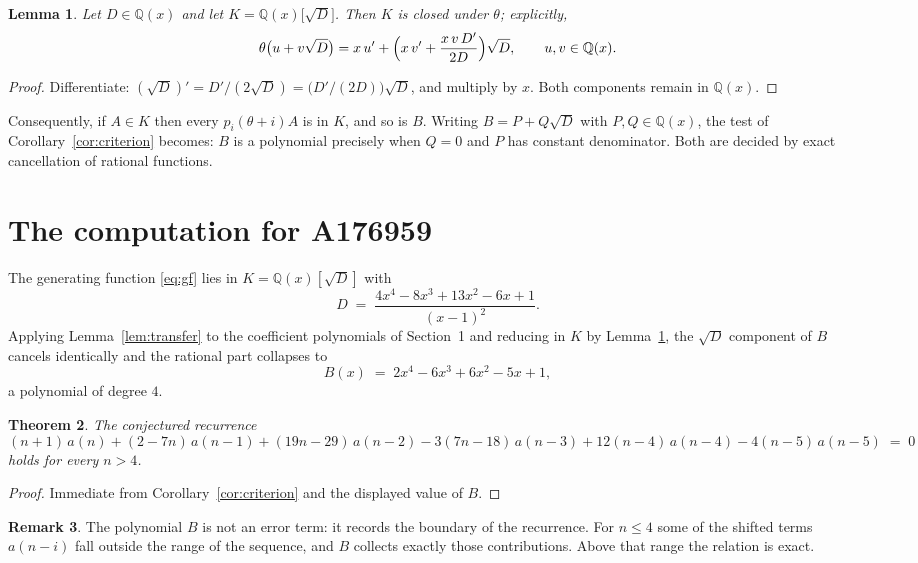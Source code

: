 \documentclass[11pt,a4paper]{article}
\theoremstyle{plain}
\newtheorem{theorem}{Theorem}
\newtheorem{lemma}[theorem]{Lemma}
\theoremstyle{definition}
\newtheorem{remark}[theorem]{Remark}
\begin{document}
\begin{lemma}\label{lem:field}
Let $D\in\mathbb{Q}(x)$ and let $K=\mathbb{Q}(x)\bigl[\sqrt{D}\bigr]$. Then $K$ is closed
under $\theta$; explicitly,
\[
\theta\bigl(u+v\sqrt{D}\bigr)=x\,u'+\Bigl(x\,v'+\frac{x\,v\,D'}{2D}\Bigr)\sqrt{D},
\qquad u,v\in\mathbb{Q}(x).
\]
\end{lemma}

\begin{proof}
Differentiate: $(\sqrt{D})'=D'/(2\sqrt{D})=\bigl(D'/(2D)\bigr)\sqrt{D}$, and multiply by
$x$. Both components remain in $\mathbb{Q}(x)$.
\end{proof}

Consequently, if $A\in K$ then every $p_{i}(\theta+i)A$ is in $K$, and so is $B$. Writing
$B=P+Q\sqrt{D}$ with $P,Q\in\mathbb{Q}(x)$, the test of Corollary~\ref{cor:criterion}
becomes: $B$ is a polynomial precisely when $Q=0$ and $P$ has constant denominator. Both
are decided by exact cancellation of rational functions.

\section{The computation for A176959}

The generating function \eqref{eq:gf} lies in $K=\mathbb{Q}(x)[\sqrt{D}]$ with
\[
D \;=\; \frac{4 x^{4} - 8 x^{3} + 13 x^{2} - 6 x + 1}{\left(x - 1\right)^{2}} .
\]
Applying Lemma~\ref{lem:transfer} to the coefficient polynomials of Section~1 and reducing
in $K$ by Lemma~\ref{lem:field}, the $\sqrt{D}$ component of $B$ cancels identically and
the rational part collapses to
\[
B(x)\;=\;2 x^{4} - 6 x^{3} + 6 x^{2} - 5 x + 1 ,
\]
a polynomial of degree $4$.

\begin{theorem}
The conjectured recurrence
\[
(n + 1)\,a(n) + (2 - 7 n)\,a(n-1) + (19 n - 29)\,a(n-2) -  3 \left(7 n - 18\right)\,a(n-3) + 12 \left(n - 4\right)\,a(n-4) -  4 \left(n - 5\right)\,a(n-5) \;=\;0
\]
holds for every $n>4$.
\end{theorem}

\begin{proof}
Immediate from Corollary~\ref{cor:criterion} and the displayed value of $B$.
\end{proof}

\begin{remark}
The polynomial $B$ is not an error term: it records the boundary of the recurrence. For
$n\le4$ some of the shifted terms $a(n-i)$ fall outside the range of the sequence,
and $B$ collects exactly those contributions. Above that range the relation is exact.
\end{remark}
\end{document}
